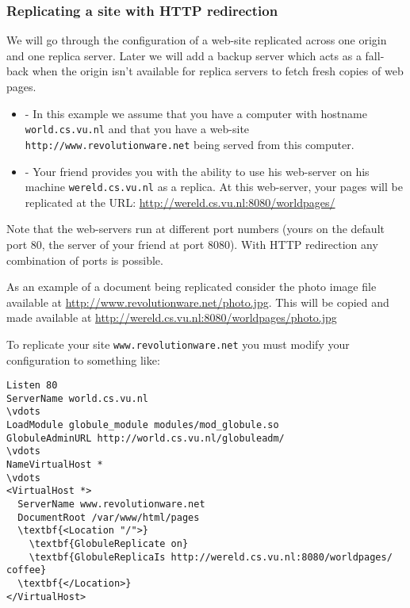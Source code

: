 \documentclass[10pt,a4paper]{article}
\makeatletter
\newenvironment{p}{\@open{P}{}}{\@close{P}}
\newenvironment{p}{}{\par}
\makeatother
\begin{document}
\subsubsection*{Replicating a site with HTTP redirection}

\begin{p}
We will go through the configuration of a web-site replicated across one
origin and one replica server.  Later we will add a backup server which acts
as a fall-back when the origin isn't available for replica servers to fetch
fresh copies of web pages.
\end{p}

\begin{p}
\begin{itemize}
\item{-} In this example we assume that you have a computer with hostname
\texttt{world.cs.vu.nl} and that you have a web-site
\verb!http://www.revolutionware.net! being served from this computer.
\item{-} Your friend provides you with the ability to use his web-server
on his machine \texttt{wereld.cs.vu.nl} as a replica.
At this web-server, your pages will be replicated at the URL:
\url{http://wereld.cs.vu.nl:8080/worldpages/}
\end{itemize}
\end{p}

\begin{p}
Note that the web-servers run at different port numbers (yours on the default
port 80, the server of your friend at port 8080).  With HTTP redirection any
combination of ports is possible.
\end{p}

\begin{p}
As an example of a document being replicated consider the photo image file
available at \url{http://www.revolutionware.net/photo.jpg}.  This will be
copied and made available at
\url{http://wereld.cs.vu.nl:8080/worldpages/photo.jpg}
\end{p}

\begin{p}
To replicate your site \texttt{www.revolutionware.net} you must modify your
configuration to something like:
\end{p}

\begin{Verbatim}[label=Your origin server's configuration]
Listen 80
ServerName world.cs.vu.nl
\vdots
LoadModule globule_module modules/mod_globule.so
GlobuleAdminURL http://world.cs.vu.nl/globuleadm/
\vdots
NameVirtualHost *
\vdots
<VirtualHost *>
  ServerName www.revolutionware.net
  DocumentRoot /var/www/html/pages
  \textbf{<Location "/">}
    \textbf{GlobuleReplicate on}
    \textbf{GlobuleReplicaIs http://wereld.cs.vu.nl:8080/worldpages/  coffee}
  \textbf{</Location>}
</VirtualHost>
\end{Verbatim}
\end{document}
